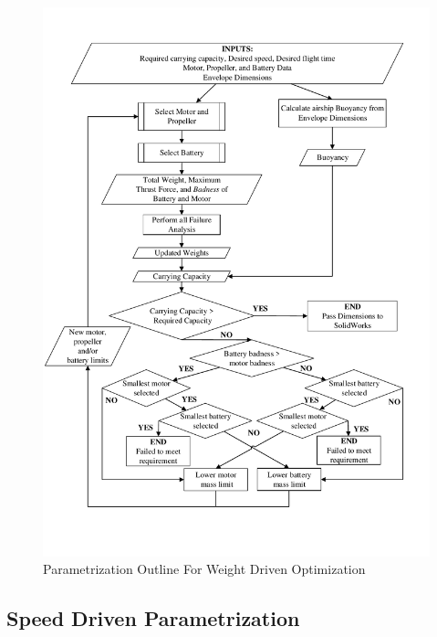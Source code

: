 \documentclass[../main.tex]{subfiles}
\begin{document}
\begin{figure}[H]
	\centering
	\includegraphics[width=0.95\linewidth]{img/paramaterization/weightBased.pdf}
	\caption{Parametrization Outline For Weight Driven Optimization}
	\label{fig:weightDriven}
\end{figure}

\subsection{Speed Driven Parametrization}
\end{document}

